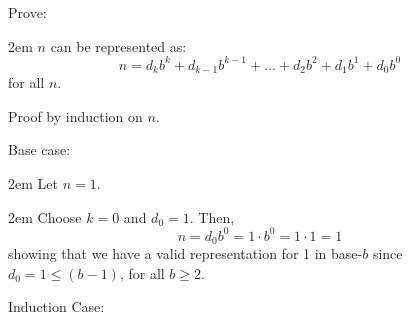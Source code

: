 \documentclass{article}
\newenvironment{jprIn}{\begin{adjustwidth}{2em}{}}{\end{adjustwidth}}
\begin{document}
Prove:
\begin{jprIn}
$n$ can be represented as:
\[n=d_kb^k+d_{k-1}b^{k-1}+\dots+d_2b^2+d_1b^1+d_0b^0\]
for all $n$.
\end{jprIn}
Proof by induction on $n$.

Base case:
\begin{jprIn}
Let $n=1$.

\begin{jprIn}
Choose $k=0$ and $d_0=1$.  Then,
\[n=d_0b^0=1\cdot{}b^0=1\cdot{}1=1\]
showing that we have a valid representation for 1 in base-$b$ since\\
$d_0=1\le(b-1)$, for all $b\ge2$.
\end{jprIn}
\end{jprIn}
\bigskip

Induction Case:
\end{document}
